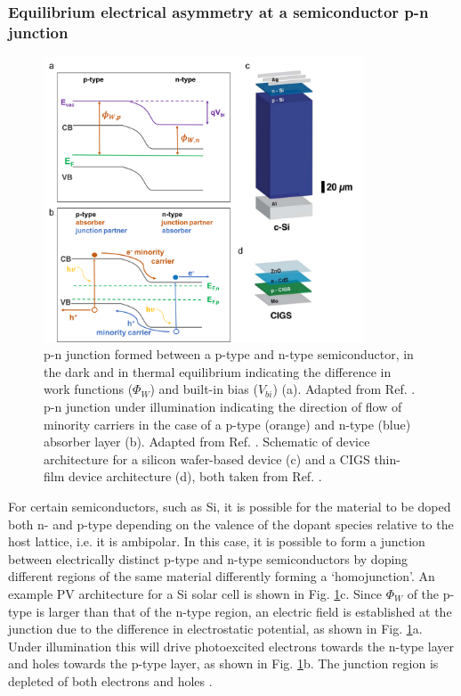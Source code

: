\documentclass[11pt, twoside]{report}
\begin{document}
\subsubsection{Equilibrium electrical asymmetry at a semiconductor p-n junction}
\begin{figure}[h!]
  \centering
    \includegraphics[width=0.85\textwidth]{figures/p-n_schematic.png}
    \caption{p-n junction formed between a p-type and n-type semiconductor, in the dark and in thermal equilibrium indicating the difference in work functions ($\Phi_W$) and built-in bias ($V_{bi}$) (a). Adapted from Ref. . p-n junction under illumination indicating the direction of flow of minority carriers in the case of a p-type (orange) and n-type (blue) absorber layer (b). Adapted from Ref. . Schematic of device architecture for a silicon wafer-based device (c) and a CIGS thin-film device architecture (d), both taken from Ref. .}
  \label{p-n_schematic}
\end{figure}

For certain semiconductors, such as Si, it is possible for the material to be doped both n- and p-type depending on the valence of the dopant species relative to the host lattice, i.e. it is ambipolar. In this case, it is possible to form a junction between electrically distinct p-type and n-type semiconductors by doping different regions of the same material differently forming a `homojunction'. An example PV architecture for a Si solar cell is shown in Fig. \ref{p-n_schematic}c. Since $\Phi_W$ of the p-type is larger than that of the n-type region, an electric field is established at the junction due to the difference in electrostatic potential, as shown in Fig. \ref{p-n_schematic}a. Under illumination this will drive photoexcited electrons towards the n-type layer and holes towards the p-type layer, as shown in Fig. \ref{p-n_schematic}b. The junction region is depleted of both electrons and holes \cite{Nelson5}.
\end{document}
